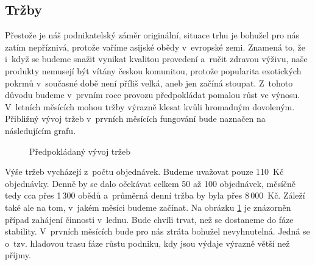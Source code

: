 \subsection{Tržby}
Přestože je náš podnikatelský záměr originální, situace trhu je bohužel pro nás zatím nepříznivá, protože vaříme asijské obědy v~evropské zemi. Znamená to, že i~když se budeme snažit vynikat kvalitou provedení a~ručit zdravou výživu, naše produkty nemusejí být vítány českou komunitou, protože popularita exotických pokrmů v~současné době není příliš velká, aneb jen začíná stoupat. Z~tohoto důvodu budeme v~prvním roce provozu předpokládat pomalou růst ve výnosu. V~letních měsících mohou tržby výrazně klesat kvůli hromadným dovoleným. Přibližný vývoj tržeb v~prvních měsících fungování bude naznačen na následujícím grafu.

\begin{figure}[htbp]
\pgfplotsset{width=14.8cm,height=6cm}
\caption{Předpokládaný vývoj tržeb}
\label{vyvoj_trzeb}
\end{figure}

Výše tržeb vycházejí z~počtu objednávek. Budeme uvažovat pouze 110~Kč objednávky. Denně by se dalo očekávat celkem 50 až 100 objednávek, měsíčně tedy cca přes 1\,300 obědů a~průměrná denní tržba by byla přes 8\,000~Kč. Záleží také ale na tom, v~jakém měsíci budeme začínat. Na obrázku \ref{vyvoj_trzeb} je znázorněn případ zahájení činnosti v~lednu. Bude chvíli trvat, než se dostaneme do fáze stability. V~prvních měsících bude pro nás ztráta bohužel nevyhnutelná. Jedná se o~tzv. hladovou trasu fáze růstu podniku, kdy jsou výdaje výrazně větší než příjmy.

